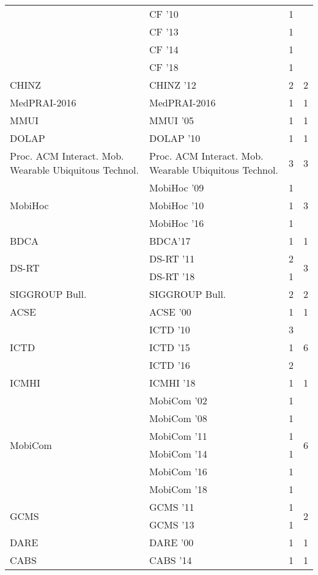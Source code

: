 \begin{table*}[t]
\begin{tabular}{llrr}
& CF '10 & 1 &\\
& CF '13 & 1 &\\
& CF '14 & 1 &\\
& CF '18 & 1 &\\
\multirow{1}{*}{CHINZ } & CHINZ '12 & 2 & \multirow{1}{*}{2}\\
\multirow{1}{*}{MedPRAI-2016} & MedPRAI-2016 & 1 & \multirow{1}{*}{1}\\
\multirow{1}{*}{MMUI } & MMUI '05 & 1 & \multirow{1}{*}{1}\\
\multirow{1}{*}{DOLAP } & DOLAP '10 & 1 & \multirow{1}{*}{1}\\
\multirow{1}{*}{Proc. ACM Interact. Mob. Wearable Ubiquitous Technol.} & Proc. ACM Interact. Mob. Wearable Ubiquitous Technol. & 3 & \multirow{1}{*}{3}\\
\multirow{3}{*}{MobiHoc } & MobiHoc '09 & 1 & \multirow{3}{*}{3}\\
& MobiHoc '10 & 1 &\\
& MobiHoc '16 & 1 &\\
\multirow{1}{*}{BDCA} & BDCA'17 & 1 & \multirow{1}{*}{1}\\
\multirow{2}{*}{DS-RT } & DS-RT '11 & 2 & \multirow{2}{*}{3}\\
& DS-RT '18 & 1 &\\
\multirow{1}{*}{SIGGROUP Bull.} & SIGGROUP Bull. & 2 & \multirow{1}{*}{2}\\
\multirow{1}{*}{ACSE } & ACSE '00 & 1 & \multirow{1}{*}{1}\\
\multirow{3}{*}{ICTD } & ICTD '10 & 3 & \multirow{3}{*}{6}\\
& ICTD '15 & 1 &\\
& ICTD '16 & 2 &\\
\multirow{1}{*}{ICMHI } & ICMHI '18 & 1 & \multirow{1}{*}{1}\\
\multirow{6}{*}{MobiCom } & MobiCom '02 & 1 & \multirow{6}{*}{6}\\
& MobiCom '08 & 1 &\\
& MobiCom '11 & 1 &\\
& MobiCom '14 & 1 &\\
& MobiCom '16 & 1 &\\
& MobiCom '18 & 1 &\\
\multirow{2}{*}{GCMS } & GCMS '11 & 1 & \multirow{2}{*}{2}\\
& GCMS '13 & 1 &\\
\multirow{1}{*}{DARE } & DARE '00 & 1 & \multirow{1}{*}{1}\\
\multirow{1}{*}{CABS } & CABS '14 & 1 & \multirow{1}{*}{1}\\

\end{tabular}
\end{table*}
